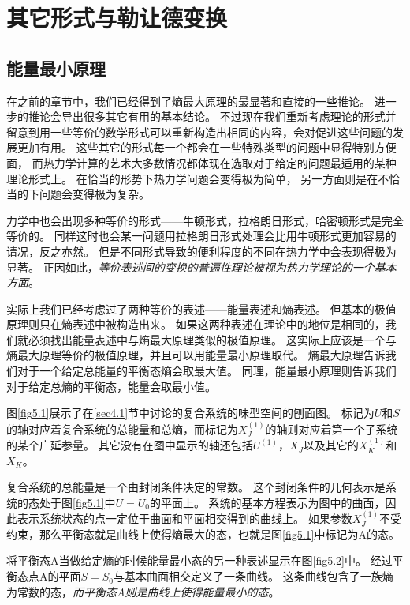 \chapter{其它形式与勒让德变换}
\label{chap5}

\section{能量最小原理}
\label{sec5.1}

在之前的章节中，我们已经得到了熵最大原理的最显著和直接的一些推论。
进一步的推论会导出很多其它有用的基本结论。
不过现在我们重新考虑理论的形式并留意到用一些等价的数学形式可以重新构造出相同的内容，会对促进这些问题的发展更加有用。
这些其它的形式每一个都会在一些特殊类型的问题中显得特别方便面，
而热力学计算的艺术大多数情况都体现在选取对于给定的问题最适用的某种理论形式上。
在恰当的形势下热力学问题会变得极为简单，
另一方面则是在不恰当的下问题会变得极为复杂。

力学中也会出现多种等价的形式——牛顿形式，拉格朗日形式，哈密顿形式是完全等价的。
同样这时也会某一问题用拉格朗日形式处理会比用牛顿形式更加容易的请况，反之亦然。
但是不同形式导致的便利程度的不同在热力学中会表现得极为显著。
正因如此，{\it 等价表述间的变换的普遍性理论被视为热力学理论的一个基本方面}。

实际上我们已经考虑过了两种等价的表述——能量表述和熵表述。
但基本的极值原理则只在熵表述中被构造出来。
如果这两种表述在理论中的地位是相同的，我们就必须找出能量表述中与熵最大原理类似的极值原理。
这实际上应该是一个与熵最大原理等价的极值原理，并且可以用能量最小原理取代。
熵最大原理告诉我们对于一个给定总能量的平衡态熵会取最大值。
同理，能量最小原理则告诉我们对于给定总熵的平衡态，能量会取最小值。

图\ref{fig5.1}展示了在\ref{sec4.1}节中讨论的复合系统的味型空间的刨面图。
标记为$U$和$S$的轴对应着复合系统的总能量和总熵，而标记为$X_J^{(1)}$的轴则对应着第一个子系统的某个广延参量。
其它没有在图中显示的轴还包括$U^{(1)}$，$X_J$以及其它的$X_K^{(1)}$和$X_K$。

复合系统的总能量是一个由封闭条件决定的常数。
这个封闭条件的几何表示是系统的态处于图\ref{fig5.1}中$U=U_0$的平面上。
系统的基本方程表示为图中的曲面，因此表示系统状态的点一定位于曲面和平面相交得到的曲线上。
如果参数$X_J^{(1)}$不受约束，那么平衡态就是曲线上使得熵最大的态，也就是图\ref{fig5.1}中标记为A的态。

将平衡态A当做给定熵的时候能量最小态的另一种表述显示在图\ref{fig5.2}中。
经过平衡态点A的平面$S=S_0$与基本曲面相交定义了一条曲线。
这条曲线包含了一族熵为常数的态，{\it 而平衡态A则是曲线上使得能量最小的态}。

